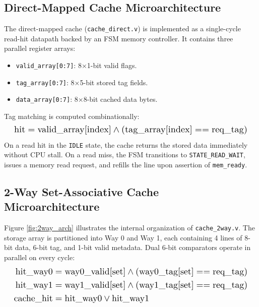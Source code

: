 \documentclass[10pt,twocolumn]{article}
\begin{document}
\subsection{Direct-Mapped Cache Microarchitecture}
The direct-mapped cache (\texttt{cache\_direct.v}) is implemented as a single-cycle read-hit datapath backed by an FSM memory controller. It contains three parallel register arrays:
\begin{itemize}
    \item \texttt{valid\_array[0:7]}: 8$\times$1-bit valid flags.
    \item \texttt{tag\_array[0:7]}: 8$\times$5-bit stored tag fields.
    \item \texttt{data\_array[0:7]}: 8$\times$8-bit cached data bytes.
\end{itemize}
Tag matching is computed combinationally:
\begin{equation}
\resizebox{0.96\columnwidth}{!}{$\displaystyle
\text{hit} = \text{valid\_array}[\text{index}] \land (\text{tag\_array}[\text{index}] == \text{req\_tag})$}
\end{equation}
On a read hit in the \texttt{IDLE} state, the cache returns the stored data immediately without CPU stall. On a read miss, the FSM transitions to \texttt{STATE\_READ\_WAIT}, issues a memory read request, and refills the line upon assertion of \texttt{mem\_ready}.

\subsection{2-Way Set-Associative Cache Microarchitecture}
Figure \ref{fig:2way_arch} illustrates the internal organization of \texttt{cache\_2way.v}. The storage array is partitioned into Way 0 and Way 1, each containing 4 lines of 8-bit data, 6-bit tag, and 1-bit valid metadata. Dual 6-bit comparators operate in parallel on every cycle:
\begin{equation}
\resizebox{0.96\columnwidth}{!}{$\displaystyle
\begin{aligned}
\text{hit\_way0} &= \text{way0\_valid}[\text{set}] \land (\text{way0\_tag}[\text{set}] == \text{req\_tag}) \\
\text{hit\_way1} &= \text{way1\_valid}[\text{set}] \land (\text{way1\_tag}[\text{set}] == \text{req\_tag}) \\
\text{cache\_hit} &= \text{hit\_way0} \lor \text{hit\_way1}
\end{aligned}$}
\end{equation}
\end{document}
